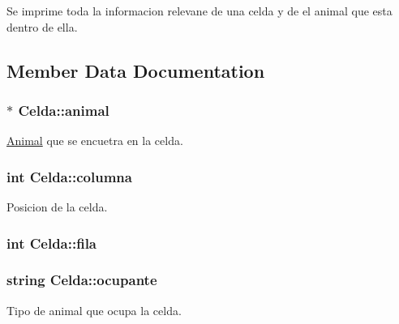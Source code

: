 Se imprime toda la informacion relevane de una celda y de el animal que esta dentro de ella. 



\subsection{Member Data Documentation}
\subsubsection[{\texorpdfstring{animal}{animal}}]{$\ast$ Celda\+::animal}\hypertarget{classCelda_a57f99719090f3f2cc587ca5ea89d6f7d}{}\label{classCelda_a57f99719090f3f2cc587ca5ea89d6f7d}


\hyperlink{classAnimal}{Animal} que se encuetra en la celda. 

\subsubsection[{\texorpdfstring{columna}{columna}}]{\setlength{\rightskip}{0pt plus 5cm}int Celda\+::columna}\hypertarget{classCelda_a5f93fabd067087b5679e6226c7eb4313}{}\label{classCelda_a5f93fabd067087b5679e6226c7eb4313}


Posicion de la celda. 

\subsubsection[{\texorpdfstring{fila}{fila}}]{\setlength{\rightskip}{0pt plus 5cm}int Celda\+::fila}\hypertarget{classCelda_a58bd35cc52cc550b75a33cdaccdd014b}{}\label{classCelda_a58bd35cc52cc550b75a33cdaccdd014b}
\subsubsection[{\texorpdfstring{ocupante}{ocupante}}]{\setlength{\rightskip}{0pt plus 5cm}string Celda\+::ocupante}\hypertarget{classCelda_aa9893b7aca0260a6305a8756971c1a53}{}\label{classCelda_aa9893b7aca0260a6305a8756971c1a53}


Tipo de animal que ocupa la celda. 

